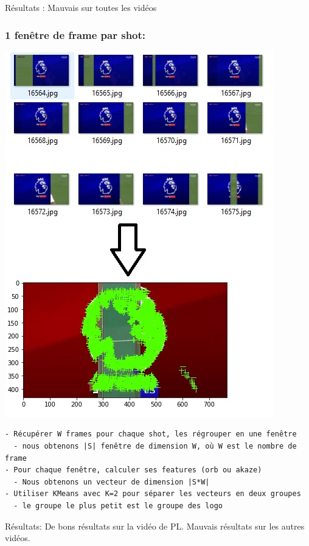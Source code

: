 \documentclass[11pt]{article}
\begin{document}
Résultats :
Mauvais sur toutes les vidéos

\subsubsection{1 fenêtre de frame par shot:}
\label{sec:orgeef12ab}
\begin{center}
\includegraphics[width=.9\linewidth]{akaze_window_res.JPG}
\end{center}
\begin{verbatim}
- Récupérer W frames pour chaque shot, les régrouper en une fenêtre
  - nous obtenons |S| fenêtre de dimension W, où W est le nombre de frame
- Pour chaque fenêtre, calculer ses features (orb ou akaze)
  - Nous obtenons un vecteur de dimension |S*W|
- Utiliser KMeans avec K=2 pour séparer les vecteurs en deux groupes
  - le groupe le plus petit est le groupe des logo
\end{verbatim}

Résultats:
De bons résultats sur la vidéo de PL.
Mauvais résultats sur les autres vidéos.
\end{document}
